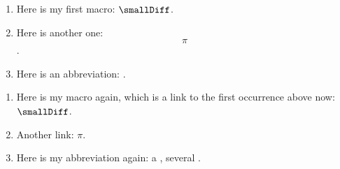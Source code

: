 \documentclass[english]{article}%
\begin{document}
\begin{enumerate}
  \item Here is my first macro: $\smallDiff$.
  \item Here is another one: \[\pi\].
  \item Here is an abbreviation: \HMM.
\end{enumerate}

\newpage

\begin{enumerate}
  \item Here is my macro again, which is a link to the first occurrence above now: $\smallDiff$.
  \item Another link: $\pi$.
  \item Here is my abbreviation again: a \HMM, several \HMMs.
\end{enumerate}

\renewcommand{\nomname}{My list of Symbols}

\printnomenclature 
\end{document}
